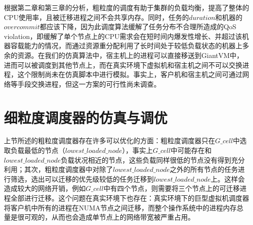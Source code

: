 根据第二章和第三章的分析，粗粒度的调度有助于集群的负载均衡，提高了整体的CPU使用率，且被迁移进程之间不会共享内存。同时，任务的$duration$和机器的$overcommit$都应该下降，因为此调度算法缓解了任务分布不合理所造成的QoS violation，即缓解了单个节点上的CPU需求会在短时间内爆发性增长、并超过该机器容载能力的情况，而通过资源重分配利用了长时间处于较低负载状态的机器上多余的资源。在我们的仿真算法中，宿主机上的进程可以直接移送到GiantVM中，进而可以被调度到其他节点上，而在真实环境下虚拟机和宿主机之间不可以交换进程，这个限制尚未在仿真脚本中进行模拟。事实上，客户机和宿主机之间可通过网络等手段交换进程，但这一方案的可行性尚未调查。

\section{细粒度调度器的仿真与调优}
上节所述的粗粒度调度器存在许多可以优化的方面：粗粒度调度器只在$G\_cell$中选取负载最低的节点（$lowest\_loaded\_node$），事实上$G\_cell$中可能存在和$lowest\_loaded\_node$负载状况相近的节点，这些负载同样很低的节点没有得到充分利用；其次，粗粒度调度器中对除了$lowest\_loaded\_node$之外的所有节点的任务进行筛选，选出可以迁移的优先级较低的任务迁移到$lowest\_loaded\_node$上。这样会造成较大的网络开销，例如$G\_cell$中有四个节点，则需要将三个节点上的可迁移进程全部进行迁移。这个问题在真实环境下也存在：真实环境下的巨型虚拟机调度器将客户机中所有的进程在NUMA节点之间迁移，而整个操作系统中的进程内存总量是很可观的，从而也会造成单节点上的网络带宽被严重占用。


